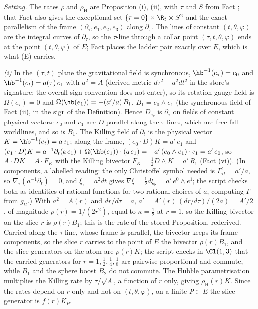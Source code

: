 \emph{Setting.} The rates $\rho$ and $\rho_{\mathrm{H}}$ are Proposition (i), (ii), with $\tau$ and $S$ from Fact ; that Fact also gives the exceptional set $\{\tau = 0\}\times\R_{t}\times S^{2}$ and the exact parallelism of the frame $(\partial_{\tau}, e_{1}, e_{2}, e_{3})$ along $\partial_{\tau}$. The lines of constant $(t, \theta, \varphi)$ are the integral curves of $\partial_{\tau}$, so the $\tau$-line through a collar point $(\tau, t, \theta, \varphi)$ ends at the point $(t, \theta, \varphi)$ of $E$; Fact  places the ladder pair exactly over $E$, which is what (E) carries.

\emph{(i)} In the $(\tau, t)$ plane the gravitational field is synchronous, $\hb^{-1}(e_{\tau}) = e_{0}$ and $\hb^{-1}(e_{t}) = a(\tau)\,e_{1}$ with $a^{2} = A$ (derived metric $d\tau^{2} - a^{2}dt^{2}$ in the store's signature; the overall sign convention does not enter), so its rotation-gauge field is $\Omega(e_{\tau}) = 0$ and $\Omega(\hb(e_{1})) = -(a'/a)\,B_{1}$, $B_{1} = e_{0}\wedge e_{1}$ (the synchronous field of Fact (ii), in the sign of the Definition). Hence $D_{e_{\tau}}$ is $\partial_{\tau}$ on fields of constant physical vectors: $e_{0}$ and $e_{1}$ are $D$-parallel along the $\tau$-lines, which are free-fall worldlines, and so is $B_{1}$. The Killing field of $\partial_{t}$ is the physical vector $K = \hb^{-1}(e_{t}) = a\,e_{1}$; along the frame, $(e_{0}\cdot D)K = a'\,e_{1}$ and $(e_{1}\cdot D)K = a^{-1}\partial_{t}(a\,e_{1}) + \Omega(\hb(e_{1}))\cdot(a\,e_{1}) = -a'\,(e_{0}\wedge e_{1})\cdot e_{1} = a'\,e_{0}$, so $A\cdot DK = A\cdot F_{K}$ with the Killing bivector $F_{K} = \tfrac12 D\wedge K = a'\,B_{1}$ (Fact (vi)). (In components, a labelled reading: the only Christoffel symbol needed is $\Gamma^{t}_{\tau t} = a'/a$, so $\nabla_{\tau}(a^{-1}\partial_{t}) = 0$, and $\xi_{\flat} = a^{2}dt$ gives $\nabla\xi = \tfrac12 d\xi_{\flat} = a'\,e^{0}\wedge e^{1}$; the script checks both as identities of rational functions for two rational choices of $a$, computing $\Gamma$ from $g_{tt}$.) With $a^{2} = A(r)$ and $dr/d\tau = a$, $a' = A'(r)\,(dr/d\tau)/(2a) = A'/2$, of magnitude $\rho(r) = 1/(2r^{2})$, equal to $\kappa = \tfrac12$ at $r = 1$, so the Killing bivector on the slice $r$ is $\rho(r)B_{1}$; this is the rate of the stored Proposition, rederived. Carried along the $\tau$-line, whose frame is parallel, the bivector keeps its frame components, so the slice $r$ carries to the point of $E$ the bivector $\rho(r)B_{1}$, and the slice generators on the atom are $\rho(r)K$; the script checks in $\Cl(1,3)$ that the carried generators for $r = 1, \tfrac12, \tfrac14, \tfrac18$ are pairwise proportional and commute, while $B_{1}$ and the sphere boost $B_{2}$ do not commute. The Hubble parametrisation multiplies the Killing rate by $\tau/\sqrt{A}$, a function of $r$ only, giving $\rho_{\mathrm{H}}(r)K$. Since the rates depend on $r$ only and not on $(t, \theta, \varphi)$, on a finite $P \subset E$ the slice generator is $f(r)K_{P}$.

